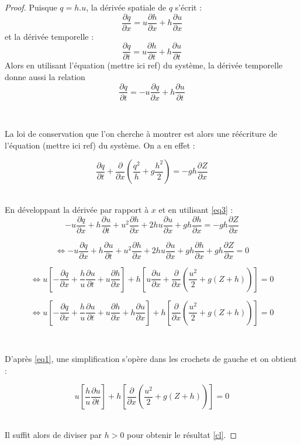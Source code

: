 \documentclass[
11pt, %
francais, %
singlespacing, %
headsepline, %
]{MastersDoctoralThesis} %
\begin{document}
\begin{proof}
Puisque $q=h.u$, la dérivée spatiale de $q$ s'écrit : \begin{equation}\frac{\partial q}{\partial x} = u\frac{\partial h}{\partial x}+h\frac{\partial u}{\partial x} \label{eq1}\end{equation}
et la dérivée temporelle : \begin{equation} \frac{\partial q}{\partial t} =  u\frac{\partial h}{\partial t} +  h\frac{\partial u}{\partial t} \label{eq2} \end{equation}
Alors en utilisant l'équation (mettre ici ref) du système, la dérivée temporelle donne aussi la relation \begin{equation}  \frac{\partial q}{\partial t}=-u\frac{\partial q}{\partial x}+h\frac{\partial u}{\partial t} \label{eq3}\end{equation}

\

La loi de conservation que l'on cherche à montrer est alors une réécriture de l'équation (mettre ici ref) du système. On a en effet :

$$
\frac{\partial q}{\partial t} + \frac{\partial }{\partial x}(\frac{q^{2}}{h}+g\frac{h^{2}}{2}) = -gh\frac{\partial Z}{\partial x}
$$
\

En développant la dérivée par rapport à $x$ et en utilisant \eqref{eq3} : 
$$
-u\frac{\partial q}{\partial x}+h\frac{\partial u}{\partial t}+u^{2}\frac{\partial h }{\partial x}+2hu\frac{\partial u}{\partial x} +gh\frac{\partial h}{\partial x}= -gh\frac{\partial Z}{\partial x}
$$

$$
\Leftrightarrow -u\frac{\partial q}{\partial x}+h\frac{\partial u}{\partial t}+u^{2}\frac{\partial h }{\partial x}+2hu\frac{\partial u}{\partial x} +gh\frac{\partial h}{\partial x} + gh\frac{\partial Z}{\partial x} =0
$$

$$
\Leftrightarrow u\left[-\frac{\partial q}{\partial x}+\frac{h}{u}\frac{\partial u}{\partial t}+u\frac{\partial h }{\partial x}\right]+h\left[u \frac{\partial u}{\partial x}+\frac{\partial}{\partial x}(\frac{u^{2}}{2}+g(Z+h))\right] =0
$$

$$
\Leftrightarrow u\left[-\frac{\partial q}{\partial x}+\frac{h}{u}\frac{\partial u}{\partial t}+u\frac{\partial h }{\partial x} + h\frac{\partial u }{\partial x}\right]+h\left[\frac{\partial}{\partial x}(\frac{u^{2}}{2}+g(Z+h))\right] =0
$$

\

D'après \eqref{eq1}, une simplification s'opère dans les crochets de gauche et on obtient :

$$
u\left[\frac{h}{u}\frac{\partial u}{\partial t}\right]+h\left[\frac{\partial}{\partial x}(\frac{u^{2}}{2}+g(Z+h))\right] =0
$$
\

Il suffit alors de diviser par $h>0$ pour obtenir le résultat \eqref{cl}.

\end{proof}
\end{document}
